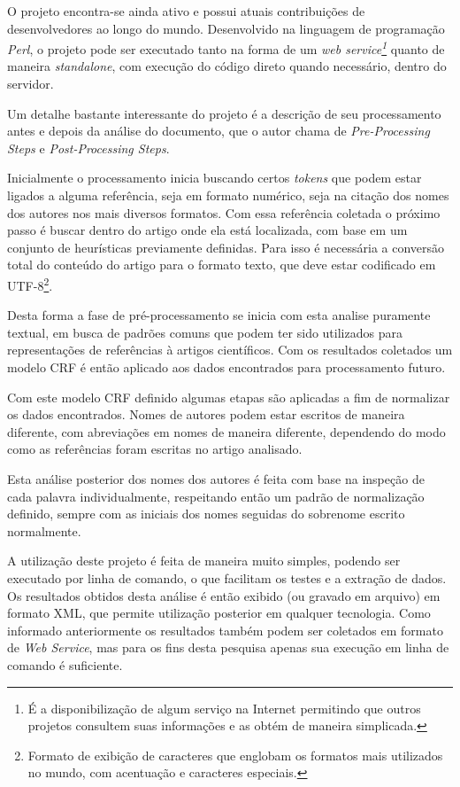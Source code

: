 O projeto encontra-se ainda ativo e possui atuais contribuições de desenvolvedores ao longo do mundo. Desenvolvido na linguagem de programação \textit{Perl}, o projeto pode ser executado tanto na forma de um \textit{web service\footnote{É a disponibilização de algum serviço na Internet permitindo que outros projetos consultem suas informações e as obtém de maneira simplicada.}} quanto de maneira \textit{standalone}, com execução do código direto quando necessário, dentro do servidor.

Um detalhe bastante interessante do projeto é a descrição de seu processamento antes e depois da análise do documento, que o autor chama de \textit{Pre-Processing Steps} e \textit{Post-Processing Steps}.

Inicialmente o processamento inicia buscando certos \textit{tokens} que podem estar ligados a alguma referência, seja em formato numérico, seja na citação dos nomes dos autores nos mais diversos formatos. Com essa referência coletada o próximo passo é buscar dentro do artigo onde ela está localizada, com base em um conjunto de heurísticas previamente definidas. Para isso é necessária a conversão total do conteúdo do artigo para o formato texto, que deve estar codificado em UTF-8\footnote{Formato de exibição de caracteres que englobam os formatos mais utilizados no mundo, com acentuação e caracteres especiais.}.

Desta forma a fase de pré-processamento se inicia com esta analise puramente textual, em busca de padrões comuns que podem ter sido utilizados para representações de referências à artigos científicos. Com os resultados coletados um modelo CRF é então aplicado aos dados encontrados para processamento futuro.

Com este modelo CRF definido algumas etapas são aplicadas a fim de normalizar os dados encontrados. Nomes de autores podem estar escritos de maneira diferente, com abreviações em nomes de maneira diferente, dependendo do modo como as referências foram escritas no artigo analisado.

Esta análise posterior dos nomes dos autores é feita com base na inspeção de cada palavra individualmente, respeitando então um padrão de normalização definido, sempre com as iniciais dos nomes seguidas do sobrenome escrito normalmente.

A utilização deste projeto é feita de maneira muito simples, podendo ser executado por linha de comando, o que facilitam os testes e a extração de dados. Os resultados obtidos desta análise é então exibido (ou gravado em arquivo) em formato XML, que permite utilização posterior em qualquer tecnologia. Como informado anteriormente os resultados também podem ser coletados em formato de \textit{Web Service}, mas para os fins desta pesquisa apenas sua execução em linha de comando é suficiente.

